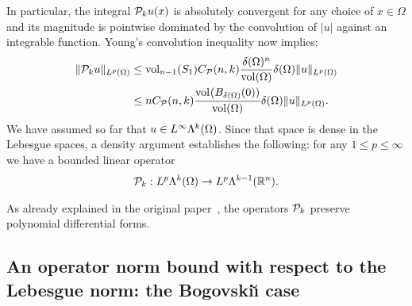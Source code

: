 \documentclass[10pt,a4paper]{article}
\begin{document}
In particular, the integral ${\mathcal P}_{k} u(x)$ is absolutely convergent for any choice of $x \in \Omega$
and its magnitude is pointwise dominated by the convolution of $|u|$ against an integrable function.
Young's convolution inequality now implies: 
\begin{align*}
    \| {\mathcal P}_{k} u \|_{L^{p}(\Omega)}
    &
    \leq 
    \operatorname{vol}_{n-1}(S_1) C_{{\mathcal P}}(n,k) \frac{ {\delta}(\Omega)^{n} }{\operatorname{vol}(\Omega)} 
    {\delta}(\Omega)
    \| u \|_{L^{p}(\Omega)}
    \\&
    \leq 
    n C_{{\mathcal P}}(n,k) \frac{ \operatorname{vol}_{}(B_{{\delta}(\Omega)}(0)) }{\operatorname{vol}(\Omega)} 
    {\delta}(\Omega)
    \| u \|_{L^{p}(\Omega)}
    .
\end{align*}
We have assumed so far that $u \in L^{\infty}\Lambda^{k}(\Omega)$. 
Since that space is dense in the Lebesgue spaces, a density argument establishes the following: 
for any $1 \leq p \leq \infty$ we have a bounded linear operator 
\begin{gather*}
    {\mathcal P}_{k} : L^{p}\Lambda^{k}(\Omega) \rightarrow L^{p}\Lambda^{k-1}({\mathbb R}^n).
\end{gather*}
% 

\begin{remark}
    As already explained in the original paper~\cite{costabel2010bogovskiui}, the operators ${\mathcal P}_{k}$ preserve polynomial differential forms. 
\end{remark}


\subsection{An operator norm bound with respect to the Lebesgue norm: the Bogovski\u{\i} case}
\end{document}

